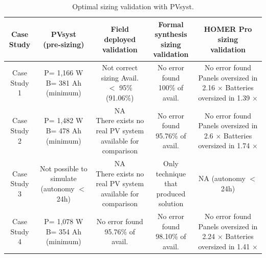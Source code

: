 \documentclass[journal]{IEEEtran}
\begin{document}
\begin{table}
\centering
\caption{Optimal sizing validation with PVsyst.}
\label{tab2}
\begin{scriptsize}
\begin{tabular}{c|c|c|c|c}
\hline
\hline
Case Study & \makecell{PVsyst\\(pre-sizing)}& \makecell{Field\\deployed\\validation}& \makecell{Formal synthesis\\sizing\\validation}& \makecell{HOMER Pro\\sizing\\validation}\\
\hline
\hline
Case Study 1 & \makecell{P= 1,166 W\\B= 381 Ah\\(minimum)} & \makecell{Not correct sizing \\Avail. $<$ 95\%\\(91.06\%)} & \makecell{No error found \\100\% of avail.} & \makecell{No error found\\Panels oversized in 2.16 $\times$\\Batteries oversized in 1.39 $\times$}\\
\hline
Case Study 2 & \makecell{P= 1,482 W\\B= 478 Ah\\(minimum)} & \makecell{NA\\There exists no real PV system\\available for comparison} & \makecell{No error found \\95.76\% of avail.} & \makecell{No error found\\Panels oversized in 2.6 $\times$\\Batteries oversized in 1.74 $\times$}\\
\hline
Case Study 3 & \makecell{Not possible to \\simulate\\(autonomy $<$ 24h)} & \makecell{NA\\There exists no real PV system\\available for comparison} & \makecell{Only technique that\\produced solution} & \makecell{NA\\(autonomy $<$ 24h)}\\
\hline
Case Study 4 & \makecell{P= 1,078 W\\B= 354 Ah\\(minimum)} & \makecell{No error found \\95.76\% of avail.} & \makecell{No error found \\98.10\% of avail.} & \makecell{No error found\\Panels oversized in 2.24 $\times$\\Batteries oversized in 1.41 $\times$}\\

\end{tabular}
\end{scriptsize}
\end{table}
\end{document}
